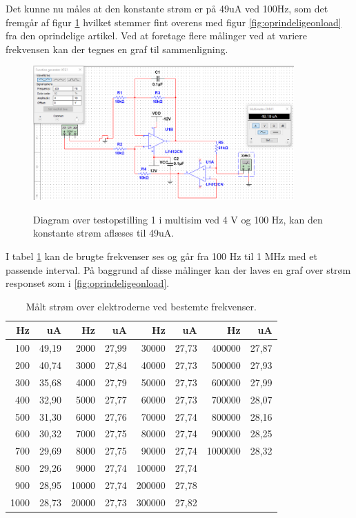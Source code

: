 Det kunne nu måles at den konstante strøm er på 49uA ved 100Hz, som det fremgår af figur \ref{fig:testopstilling1multisimnoload} hvilket stemmer fint overens med figur \ref{fig:oprindeligeonload} fra den oprindelige artikel. Ved at foretage flere målinger ved at variere frekvensen kan der tegnes en graf til sammenligning.

\begin{figure}[H]
\centering
{\includegraphics[width=10cm]
{Figure/testopstilling1multisimnoload}}
\caption{Diagram over testopstilling 1 i multisim ved 4 V og 100 Hz, kan den konstante strøm aflæses til 49uA.}
\label{fig:testopstilling1multisimnoload}
\end{figure}

I tabel \ref{table:frekvensernoload} kan de brugte frekvenser ses og går fra 100 Hz til 1 MHz med et passende interval. På baggrund af disse målinger kan der laves en graf over strøm responset som i \ref{fig:oprindeligeonload}.

\begin{table}[H]
\centering
\begin{tabular}{| r | r || r | r || r | r || r | r |}
    \hline
    \textbf{Hz} & \textbf{uA} & \textbf{Hz} & \textbf{uA} & \textbf{Hz} & \textbf{uA} & \textbf{Hz} & \textbf{uA}\\ \hline
    100 & 49,19 & 2000 & 27,99 & 30000 & 27,73 & 400000 & 27,87  \\ \hline
    200 & 40,74 & 3000 & 27,84 & 40000 & 27,73 & 500000 & 27,93  \\ \hline
    300 & 35,68 & 4000 & 27,79 & 50000 & 27,73 & 600000 & 27,99  \\ \hline
    400 & 32,90 & 5000 & 27,77 & 60000 & 27,73 & 700000 & 28,07  \\ \hline
    500 & 31,30 & 6000 & 27,76 & 70000 & 27,74 & 800000 & 28,16  \\ \hline
    600 & 30,32 & 7000 & 27,75 & 80000 & 27,74 & 900000 & 28,25  \\ \hline
    700 & 29,69 & 8000 & 27,75 & 90000 & 27,74 & 1000000 & 28,32  \\ \hline
    800 & 29,26 & 9000 & 27,74 & 100000 & 27,74 &  &   \\ \hline
    900 & 28,95 & 10000 & 27,74 & 200000 & 27,78 &  &   \\ \hline
    1000 & 28,73 & 20000 & 27,73 & 300000 & 27,82 &  &  \\ \hline
\end{tabular}
    \caption{Målt strøm over elektroderne ved bestemte frekvenser.}
    \label{table:frekvensernoload}
\end{table} 


